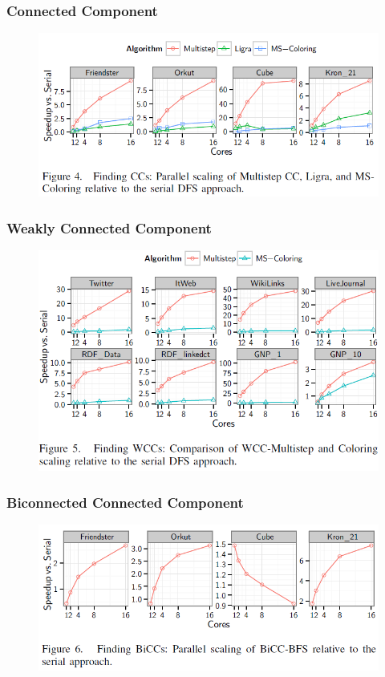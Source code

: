 \begin{frame}
	\frametitle{Connected Component}
	\begin{figure}
		\includegraphics[scale=0.40]{figure/fig-result-f2.png}
	\end{figure}
\end{frame}

\begin{frame}
	\frametitle{Weakly Connected Component}
	\begin{figure}
		\includegraphics[scale=0.40]{figure/fig-result-f3.png}
	\end{figure}
\end{frame}

\begin{frame}
	\frametitle{Biconnected Connected Component}
	\begin{figure}
		\includegraphics[scale=0.40]{figure/fig-result-f4.png}
	\end{figure}
\end{frame}